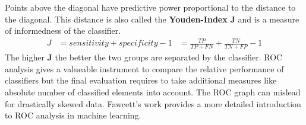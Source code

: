 Points above the diagonal have predictive power proportional to the distance to the diagonal.
This distance is also called the \textbf{Youden-Index} $\mathbf{J}$ and is a measure of informedness of the classifier.
\begin{equation}
\begin{aligned}
    J &= sensitivity + specificity - 1
      &= \frac{TP}{TP + FN} + \frac{TN}{TN + FP} - 1
\end{aligned}
\label{eq:youden}
\end{equation}
The higher $\mathbf{J}$ the better the two groups are separated by the classifier.
ROC analysis gives a valueable instrument to compare the relative performance of classifiers but the final evaluation requires to take additional measures like absolute number of classified elements into account.
The ROC graph can mislead for drastically skewed data.
Fawcett's\cite{fawcett_2006} work provides a more detailed introduction to ROC analysis in machine learning.
